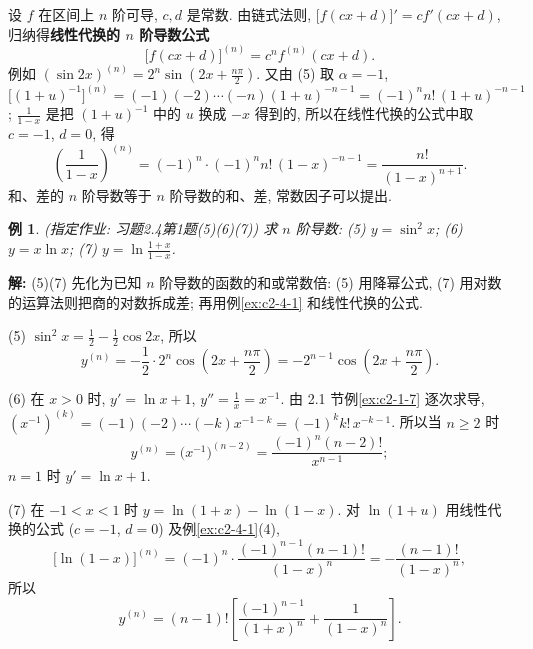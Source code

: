 \documentclass[UTF8,openany]{ctexbook}
\theoremstyle{chinesetextbook}
\newtheorem{example}{例}[section]
\newenvironment{cnsolution}{\par\indent\textbf{解:} \ignorespaces}{\par}
\begin{document}
设 $f$ 在区间上 $n$ 阶可导, $c,d$ 是常数. 由链式法则, $\bigl[f(cx+d)\bigr]'=cf'(cx+d)$, 归纳得\textbf{线性代换的 $n$ 阶导数公式}
\[
\bigl[f(cx+d)\bigr]^{(n)}=c^nf^{(n)}(cx+d).
\]
例如 $\displaystyle(\sin2x)^{(n)}=2^n\sin\left(2x+\frac{n\pi}2\right)$. 又由 (5) 取 $\alpha=-1$, $\bigl[(1+u)^{-1}\bigr]^{(n)}=(-1)(-2)\cdots(-n)(1+u)^{-n-1}=(-1)^nn!\,(1+u)^{-n-1}$; $\displaystyle\frac1{1-x}$ 是把 $(1+u)^{-1}$ 中的 $u$ 换成 $-x$ 得到的, 所以在线性代换的公式中取 $c=-1$, $d=0$, 得
\[
\left(\frac1{1-x}\right)^{(n)}=(-1)^n\cdot(-1)^nn!\,(1-x)^{-n-1}=\frac{n!}{(1-x)^{n+1}}.
\]
和、差的 $n$ 阶导数等于 $n$ 阶导数的和、差, 常数因子可以提出.
\begin{example}\label{ex:c2-h4-1}
\textnormal{(指定作业: 习题2.4第1题(5)(6)(7))} 求 $n$ 阶导数: (5) $y=\sin^2x$; (6) $y=x\ln x$; (7) $\displaystyle y=\ln\frac{1+x}{1-x}$.
\end{example}
\begin{cnsolution}
(5)(7) 先化为已知 $n$ 阶导数的函数的和或常数倍: (5) 用降幂公式, (7) 用对数的运算法则把商的对数拆成差; 再用例\ref{ex:c2-4-1} 和线性代换的公式.

(5) $\displaystyle\sin^2x=\frac12-\frac12\cos2x$, 所以
\[
y^{(n)}=-\frac12\cdot2^n\cos\left(2x+\frac{n\pi}2\right)=-2^{n-1}\cos\left(2x+\frac{n\pi}2\right).
\]

(6) 在 $x>0$ 时, $y'=\ln x+1$, $\displaystyle y''=\frac1x=x^{-1}$. 由 2.1 节例\ref{ex:c2-1-7} 逐次求导, $(x^{-1})^{(k)}=(-1)(-2)\cdots(-k)x^{-1-k}=(-1)^kk!\,x^{-k-1}$. 所以当 $n\ge2$ 时
\[
y^{(n)}=\bigl(x^{-1}\bigr)^{(n-2)}=\frac{(-1)^n(n-2)!}{x^{n-1}};
\]
$n=1$ 时 $y'=\ln x+1$.

(7) 在 $-1<x<1$ 时 $y=\ln(1+x)-\ln(1-x)$. 对 $\ln(1+u)$ 用线性代换的公式 ($c=-1$, $d=0$) 及例\ref{ex:c2-4-1}(4),
\[
\bigl[\ln(1-x)\bigr]^{(n)}=(-1)^n\cdot\frac{(-1)^{n-1}(n-1)!}{(1-x)^n}=-\frac{(n-1)!}{(1-x)^n},
\]
所以
\[
y^{(n)}=(n-1)!\left[\frac{(-1)^{n-1}}{(1+x)^n}+\frac1{(1-x)^n}\right].
\]
\end{cnsolution}
\end{document}
